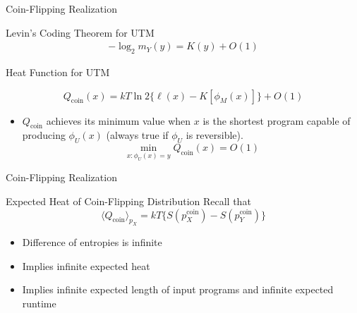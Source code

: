 \begin{frame}{Coin-Flipping Realization}
    \begin{block}{Levin's Coding Theorem for UTM}
    {\footnotesize
    \begin{align*}
        -\log_2 m_Y(y) = K(y) + O(1)
    \end{align*}
    }
    \end{block}
    \begin{block}{Heat Function for UTM}
    {\footnotesize
    \begin{equation*}
        Q_\text{coin}(x) = kT\ln 2 \{\ell(x) - K[\phi_M(x)]\} + O(1)
    \end{equation*}
    \begin{itemize}
        \item $Q_\text{coin}$ achieves its minimum value when $x$ is the shortest program capable of producing $\phi_U(x)$ (always true if $\phi_U$ is reversible).
        \begin{equation*}
            \min_{x:\phi_U(x)=y} Q_\text{coin}(x) = O(1)
        \end{equation*}
    \end{itemize}
    }
    \end{block}
\end{frame}

\begin{frame}{Coin-Flipping Realization}
\begin{block}{Expected Heat of Coin-Flipping Distribution}
Recall that 
\begin{equation*}
    \langle Q_\text{coin}\rangle_{p_X} = kT\{ S(p_X^\text{coin}) - S(p_Y^\text{coin})\}
\end{equation*}
\begin{itemize}
    \item Difference of entropies is infinite
    \item Implies infinite expected heat
    \item Implies infinite expected length of input programs and infinite expected runtime
\end{itemize}
\end{block}
\end{frame}

